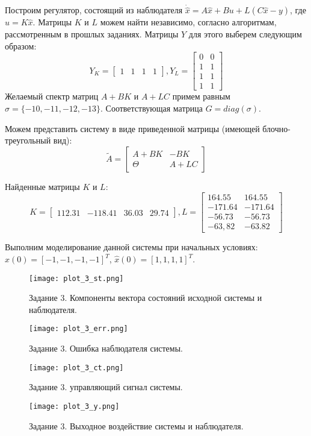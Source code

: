 Построим регулятор, состоящий из наблюдателя $\dot{\hat x} = A\hat x + Bu + L(C\hat x - y)$,
где $u = K\hat x$. Матрицы $K$ и $L$ можем найти независимо, согласно алгоритмам, рассмотренным
в прошлых заданиях. Матрицы $Y$ для этого выберем следующим образом:
\begin{equation*}
    Y_K = \begin{bmatrix}
        1 & 1 & 1 & 1
    \end{bmatrix},
    Y_L = \begin{bmatrix}
        0 & 0 \\
        1 & 1 \\
        1 & 1 \\
        1 & 1
    \end{bmatrix}
\end{equation*}
Желаемый спектр матриц $A + BK$ и $A + LC$ примем равным $\sigma=\{-10,-11,-12,-13\}$.
Соответствующая матрица $G=diag(\sigma)$.

Можем представить систему в виде приведенной матрицы (имеющей блочно-треугольный вид):
\begin{equation}
    \tilde{A} = \begin{bmatrix}
        A + BK & -BK \\
        \Theta & A + LC
    \end{bmatrix}
\end{equation}

Найденные матрицы $K$ и $L$:
\begin{equation*}
    K = \begin{bmatrix}
        112.31 & -118.41 & 36.03 & 29.74
    \end{bmatrix},
    L =\begin{bmatrix}
        164.55 & 164.55 \\
        -171.64 & -171.64 \\
        -56.73 & -56.73 \\
        -63,82 & -63.82
    \end{bmatrix}
\end{equation*}

Выполним моделирование данной системы при начальных условиях: $x(0) = [-1,-1,-1,-1]^T$, $\hat x (0) = [1,1,1,1]^T$.
\begin{figure}[]
    \centering
    \texttt{[image: plot\_3\_st.png]}
    \caption{\label{fig:The-caption-1}Задание 3. Компоненты вектора состояний исходной системы и наблюдателя.}
\end{figure}
\begin{figure}[]
    \centering
    \texttt{[image: plot\_3\_err.png]}
    \caption{\label{fig:The-caption-1}Задание 3. Ошибка наблюдателя системы.}
\end{figure}
\begin{figure}[]
    \centering
    \texttt{[image: plot\_3\_ct.png]}
    \caption{\label{fig:The-caption-1}Задание 3. управляющий сигнал системы.}
\end{figure}
\begin{figure}[]
    \centering
    \texttt{[image: plot\_3\_y.png]}
    \caption{\label{fig:The-caption-1}Задание 3. Выходное воздействие системы и наблюдателя.}
\end{figure}
\pagebreak

